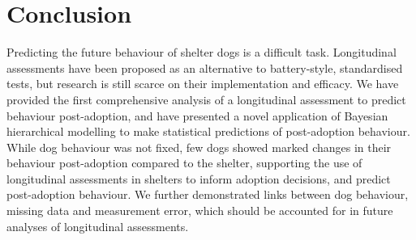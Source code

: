 \documentclass[12pt]{article}
\begin{document}
\section{Conclusion}
Predicting the future behaviour of shelter dogs is a difficult task. Longitudinal assessments have been proposed as an alternative to battery-style, standardised tests, but research is still scarce on their implementation and efficacy. We have provided the first comprehensive analysis of a longitudinal assessment to predict behaviour post-adoption, and have presented a novel application of Bayesian hierarchical modelling to make statistical predictions of post-adoption behaviour. While dog behaviour was not fixed, few dogs showed marked changes in their behaviour post-adoption compared to the shelter, supporting the use of longitudinal assessments in shelters to inform adoption decisions, and predict post-adoption behaviour. We further demonstrated links between dog behaviour, missing data and measurement error, which should be accounted for in future analyses of longitudinal assessments.


\newpage
\printbibliography
\end{document}
